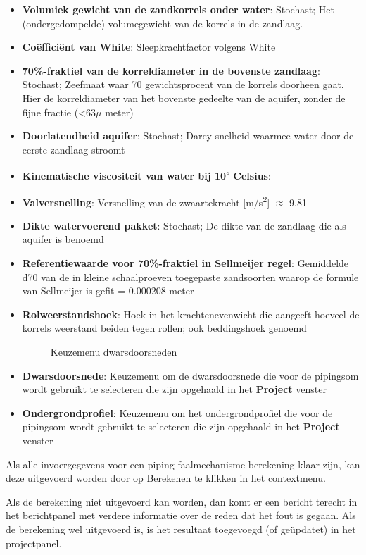 \begin{enumerate}
\begin{itemize}
	\item \textbf{Volumiek gewicht van de zandkorrels onder water}: Stochast; Het (ondergedompelde) volumegewicht van de korrels in de zandlaag.
	\item \textbf{Co\"{e}ffici\"{e}nt van White}: Sleepkrachtfactor volgens White
	\item \textbf{70\%-fraktiel van de korreldiameter in de bovenste zandlaag}: Stochast; Zeefmaat waar 70 gewichtsprocent van de korrels doorheen gaat. Hier de korreldiameter van het bovenste gedeelte van de aquifer, zonder de fijne fractie (<63$\mu$ meter)
	\item \textbf{Doorlatendheid aquifer}: Stochast; Darcy-snelheid waarmee water door de eerste zandlaag stroomt
	\item \textbf{Kinematische viscositeit van water bij 10\textsuperscript{$\circ$} Celsius}: 
	\item \textbf{Valversnelling}: Versnelling van de zwaartekracht [m/s\textsuperscript{2}] $\approx$ 9.81
	\item \textbf{Dikte watervoerend pakket}: Stochast; De dikte van de zandlaag die als aquifer is benoemd
	\item \textbf{Referentiewaarde voor 70\%-fraktiel in Sellmeijer regel}: Gemiddelde d70 van de in kleine schaalproeven toegepaste zandsoorten waarop de formule van Sellmeijer is gefit = 0.000208 meter
	\item \textbf{Rolweerstandshoek}: Hoek in het krachtenevenwicht die aangeeft hoeveel de korrels weerstand beiden tegen rollen; ook beddingshoek genoemd
	\begin{figure} [H]
	\centering
	\caption{Keuzemenu dwarsdoorsneden}
	\label{fig:fig5.6}
\end{figure}
	\item \textbf{Dwarsdoorsnede}: Keuzemenu om de dwarsdoorsnede die voor de pipingsom wordt gebruikt te selecteren die zijn opgehaald in het \textbf{Project} venster
	\item \textbf{Ondergrondprofiel}: Keuzemenu om het ondergrondprofiel die voor de pipingsom wordt gebruikt te selecteren die zijn opgehaald in het \textbf{Project} venster
	\end{itemize}

\end{enumerate}








Als alle invoergegevens voor een piping faalmechanisme berekening klaar zijn, kan deze uitgevoerd worden door op Berekenen te klikken in het contextmenu.

Als de berekening niet uitgevoerd kan worden, dan komt er een bericht terecht in het berichtpanel met verdere informatie over de reden dat het fout is gegaan. Als de berekening wel uitgevoerd is, is het resultaat toegevoegd (of ge\"{u}pdatet) in het projectpanel.





